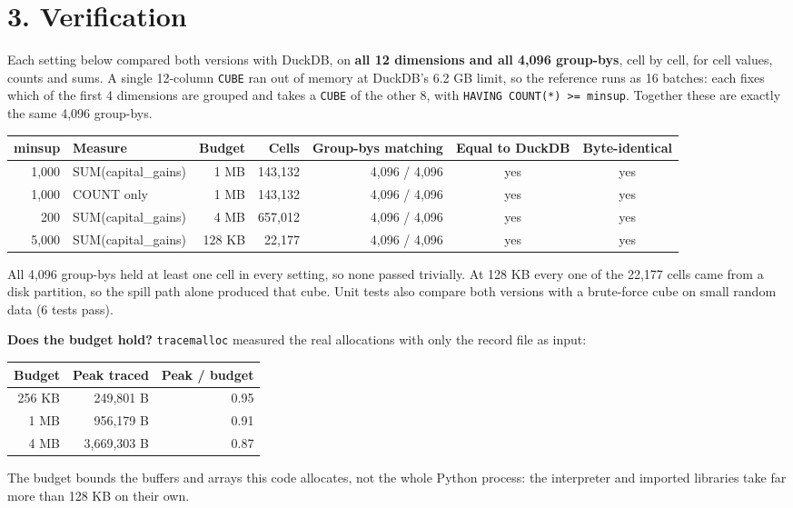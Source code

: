 \documentclass[10pt]{article}
\begin{document}
\section*{3. Verification}
Each setting below compared both versions with DuckDB, on \textbf{all 12 dimensions and all 4,096 group-bys}, cell by cell, for cell values, counts and sums. A single 12-column \texttt{CUBE} ran out of memory at DuckDB's 6.2 GB limit, so the reference runs as 16 batches: each fixes which of the first 4 dimensions are grouped and takes a \texttt{CUBE} of the other 8, with \texttt{HAVING COUNT(*) >= minsup}. Together these are exactly the same 4,096 group-bys.
\begin{center}\small
\begin{tabular}{rlrrrcc}
\toprule
minsup & Measure & Budget & Cells & Group-bys matching & Equal to DuckDB & Byte-identical \\
\midrule
1,000 & SUM(capital\_gains) & 1 MB & 143,132 & 4,096 / 4,096 & yes & yes \\
1,000 & COUNT only & 1 MB & 143,132 & 4,096 / 4,096 & yes & yes \\
200 & SUM(capital\_gains) & 4 MB & 657,012 & 4,096 / 4,096 & yes & yes \\
5,000 & SUM(capital\_gains) & 128 KB & 22,177 & 4,096 / 4,096 & yes & yes \\
\bottomrule
\end{tabular}
\end{center}
All 4,096 group-bys held at least one cell in every setting, so none passed trivially. At 128 KB every one of the 22,177 cells came from a disk partition, so the spill path alone produced that cube. Unit tests also compare both versions with a brute-force cube on small random data (6 tests pass).

\textbf{Does the budget hold?} \texttt{tracemalloc} measured the real allocations with only the record file as input:
\begin{center}\small
\begin{tabular}{rrr}
\toprule
Budget & Peak traced & Peak / budget \\
\midrule
256 KB & 249,801 B & 0.95 \\
1 MB & 956,179 B & 0.91 \\
4 MB & 3,669,303 B & 0.87 \\
\bottomrule
\end{tabular}
\end{center}
The budget bounds the buffers and arrays this code allocates, not the whole Python process: the interpreter and imported libraries take far more than 128 KB on their own.
\end{document}
